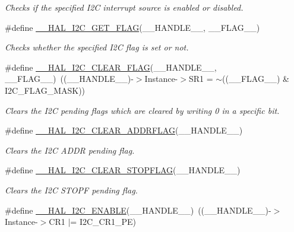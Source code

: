 \begin{DoxyCompactItemize}
\begin{DoxyCompactList}\small\item\em Checks if the specified I2C interrupt source is enabled or disabled. \end{DoxyCompactList}\item 
\#define \hyperlink{group___i2_c___exported___macros_gafbdf01a7dc3183de7af56456cab93551}{\+\_\+\+\_\+\+H\+A\+L\+\_\+\+I2\+C\+\_\+\+G\+E\+T\+\_\+\+F\+L\+AG}(\+\_\+\+\_\+\+H\+A\+N\+D\+L\+E\+\_\+\+\_\+,  \+\_\+\+\_\+\+F\+L\+A\+G\+\_\+\+\_\+)
\begin{DoxyCompactList}\small\item\em Checks whether the specified I2C flag is set or not. \end{DoxyCompactList}\item 
\#define \hyperlink{group___i2_c___exported___macros_ga933e2ea67e86db857a06b70a93be1186}{\+\_\+\+\_\+\+H\+A\+L\+\_\+\+I2\+C\+\_\+\+C\+L\+E\+A\+R\+\_\+\+F\+L\+AG}(\+\_\+\+\_\+\+H\+A\+N\+D\+L\+E\+\_\+\+\_\+,  \+\_\+\+\_\+\+F\+L\+A\+G\+\_\+\+\_\+)~((\+\_\+\+\_\+\+H\+A\+N\+D\+L\+E\+\_\+\+\_\+)-\/$>$Instance-\/$>$S\+R1 = $\sim$((\+\_\+\+\_\+\+F\+L\+A\+G\+\_\+\+\_\+) \& I2\+C\+\_\+\+F\+L\+A\+G\+\_\+\+M\+A\+SK))
\begin{DoxyCompactList}\small\item\em Clears the I2C pending flags which are cleared by writing 0 in a specific bit. \end{DoxyCompactList}\item 
\#define \hyperlink{group___i2_c___exported___macros_ga15a0a1a04971d44f9a1b82cab10af24f}{\+\_\+\+\_\+\+H\+A\+L\+\_\+\+I2\+C\+\_\+\+C\+L\+E\+A\+R\+\_\+\+A\+D\+D\+R\+F\+L\+AG}(\+\_\+\+\_\+\+H\+A\+N\+D\+L\+E\+\_\+\+\_\+)
\begin{DoxyCompactList}\small\item\em Clears the I2C A\+D\+DR pending flag. \end{DoxyCompactList}\item 
\#define \hyperlink{group___i2_c___exported___macros_gae8e94c16809df16411862b11fea781db}{\+\_\+\+\_\+\+H\+A\+L\+\_\+\+I2\+C\+\_\+\+C\+L\+E\+A\+R\+\_\+\+S\+T\+O\+P\+F\+L\+AG}(\+\_\+\+\_\+\+H\+A\+N\+D\+L\+E\+\_\+\+\_\+)
\begin{DoxyCompactList}\small\item\em Clears the I2C S\+T\+O\+PF pending flag. \end{DoxyCompactList}\item 
\#define \hyperlink{group___i2_c___exported___macros_gacff412c47b0c1d63ef3b2a07f65988b7}{\+\_\+\+\_\+\+H\+A\+L\+\_\+\+I2\+C\+\_\+\+E\+N\+A\+B\+LE}(\+\_\+\+\_\+\+H\+A\+N\+D\+L\+E\+\_\+\+\_\+)~((\+\_\+\+\_\+\+H\+A\+N\+D\+L\+E\+\_\+\+\_\+)-\/$>$Instance-\/$>$C\+R1 $\vert$=  I2\+C\+\_\+\+C\+R1\+\_\+\+PE)

\end{DoxyCompactItemize}
